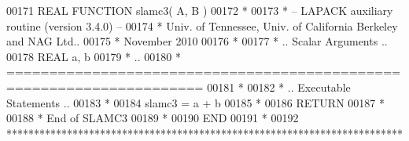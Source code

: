 \begin{DoxyCode}
00171 \textcolor{keyword}{      REAL             }\textcolor{keyword}{FUNCTION }slamc3( A, B )
00172 \textcolor{comment}{*}
00173 \textcolor{comment}{*  -- LAPACK auxiliary routine (version 3.4.0) --}
00174 \textcolor{comment}{*     Univ. of Tennessee, Univ. of California Berkeley and NAG Ltd..}
00175 \textcolor{comment}{*     November 2010}
00176 \textcolor{comment}{*}
00177 \textcolor{comment}{*     .. Scalar Arguments ..}
00178       \textcolor{keywordtype}{REAL}               a, b
00179 \textcolor{comment}{*     ..}
00180 \textcolor{comment}{* =====================================================================}
00181 \textcolor{comment}{*}
00182 \textcolor{comment}{*     .. Executable Statements ..}
00183 \textcolor{comment}{*}
00184       slamc3 = a + b
00185 \textcolor{comment}{*}
00186       \textcolor{keywordflow}{RETURN}
00187 \textcolor{comment}{*}
00188 \textcolor{comment}{*     End of SLAMC3}
00189 \textcolor{comment}{*}
00190 \textcolor{keyword}{      END}
00191 \textcolor{comment}{*}
00192 \textcolor{comment}{************************************************************************}
\end{DoxyCode}

